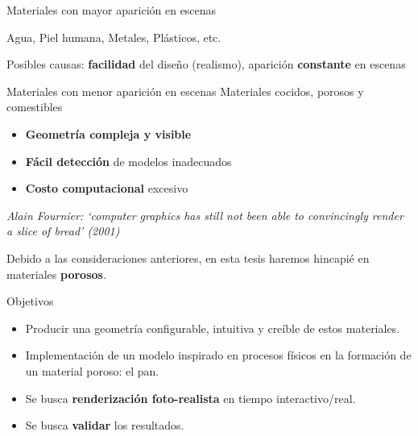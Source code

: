 \documentclass[spanish,unknownkeysallowed]{beamer}
\begin{document}
\begin{frame}{}

\begin{block}{Materiales con mayor aparición en escenas}

Agua, Piel humana, Metales, Plásticos, etc. 

Posibles causas: \textbf{facilidad} del diseño (realismo), aparición \textbf{constante} en escenas

\end{block}

\begin{block}{Materiales con menor aparición en escenas}
Materiales cocidos, porosos y comestibles


\begin{itemize}
\item \textbf{Geometría compleja y visible}
\item \textbf{Fácil detección} de modelos inadecuados
\item \textbf{Costo computacional} excesivo
\end{itemize}
\end{block}

{\it Alain Fournier: `computer graphics has still not been
able to convincingly render a slice of bread' (2001)}


\end{frame}

\begin{frame}
\begin{block}{}
Debido a las consideraciones anteriores, en esta tesis haremos hincapié en materiales \textbf{porosos}.

Objetivos
\begin{itemize}
\item Producir una geometría configurable, intuitiva y creíble de estos materiales.
\item Implementación de un modelo inspirado en procesos físicos en la formación de un material poroso: el pan.
\item Se busca \textbf{renderización foto-realista} en tiempo interactivo/real.
\item Se busca \textbf{validar} los resultados.
\end{itemize}



\end{block}
\end{frame}
\end{document}
